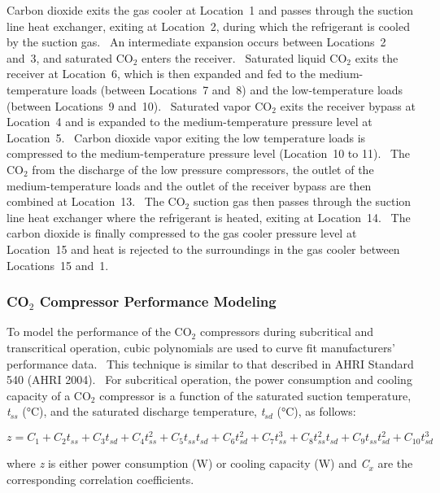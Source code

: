 Carbon dioxide exits the gas cooler at Location~1 and passes through the suction line heat exchanger, exiting at Location~2, during which the refrigerant is cooled by the suction gas.~ An intermediate expansion occurs between Locations~2 and~3, and saturated CO\(_{2}\) enters the receiver.~ Saturated liquid CO\(_{2}\) exits the receiver at Location~6, which is then expanded and fed to the medium-temperature loads (between Locations~7 and~8) and the low-temperature loads (between Locations~9 and~10).~ Saturated vapor CO\(_{2}\) exits the receiver bypass at Location~4 and is expanded to the medium-temperature pressure level at Location~5.~ Carbon dioxide vapor exiting the low temperature loads is compressed to the medium-temperature pressure level (Location~10 to 11).~ The CO\(_{2}\) from the discharge of the low pressure compressors, the outlet of the medium-temperature loads and the outlet of the receiver bypass are then combined at Location~13.~ The CO\(_{2}\) suction gas then passes through the suction line heat exchanger where the refrigerant is heated, exiting at Location~14.~ The carbon dioxide is finally compressed to the gas cooler pressure level at Location~15 and heat is rejected to the surroundings in the gas cooler between Locations~15 and~1.

\subsubsection{CO\(_{2}\) Compressor Performance Modeling}\label{coux5f2-compressor-performance-modeling}

To model the performance of the CO\(_{2}\) compressors during subcritical and transcritical operation, cubic polynomials are used to curve fit manufacturers' performance data.~ This technique is similar to that described in AHRI Standard 540 (AHRI 2004).~ For subcritical operation, the power consumption and cooling capacity of a CO\(_{2}\) compressor is a function of the saturated suction temperature, \emph{t\(_{ss}\)} (°C), and the saturated discharge temperature, \emph{t\(_{sd}\)} (°C), as follows:

\begin{equation}
z = {C_1} + {C_2}{t_{ss}} + {C_3}{t_{sd}} + {C_4}t_{ss}^2 + {C_5}{t_{ss}}{t_{sd}} + {C_6}t_{sd}^2 + {C_7}t_{ss}^3 + {C_8}t_{ss}^2{t_{sd}} + {C_9}{t_{ss}}t_{sd}^2 + {C_{10}}t_{sd}^3
\end{equation}

where \emph{z} is either power consumption (W) or cooling capacity (W) and \emph{C\(_{x}\)} are the corresponding correlation coefficients.

